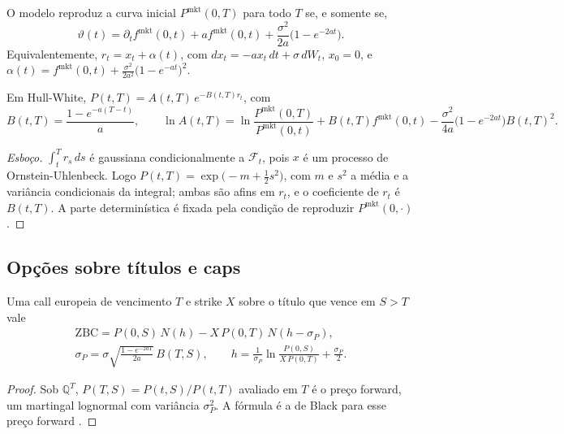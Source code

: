 \begin{proposicao}\label{prop:hw-theta}
O modelo reproduz a curva inicial $P^{\mathrm{mkt}}(0,T)$ para todo $T$ se, e somente se,
\begin{equation}
\vartheta(t)=\partial_tf^{\mathrm{mkt}}(0,t)+af^{\mathrm{mkt}}(0,t)+\frac{\sigma^2}{2a}\big(1-e^{-2at}\big).
\end{equation}
Equivalentemente, $r_t=x_t+\alpha(t)$, com $dx_t=-ax_t\,dt+\sigma\,dW_t$, $x_0=0$, e $\alpha(t)=f^{\mathrm{mkt}}(0,t)+\frac{\sigma^2}{2a^2}\big(1-e^{-at}\big)^2$.
\end{proposicao}

\begin{proposicao}
Em Hull-White, $P(t,T)=A(t,T)\,e^{-B(t,T)r_t}$, com
\begin{equation}
B(t,T)=\frac{1-e^{-a(T-t)}}{a},\qquad \ln A(t,T)=\ln\frac{P^{\mathrm{mkt}}(0,T)}{P^{\mathrm{mkt}}(0,t)}+B(t,T)f^{\mathrm{mkt}}(0,t)-\frac{\sigma^2}{4a}\big(1-e^{-2at}\big)B(t,T)^2.
\end{equation}
\end{proposicao}

\begin{proof}[Esboço]
$\int_t^Tr_s\,ds$ é gaussiana condicionalmente a $\mathcal F_t$, pois $x$ é um processo de Ornstein-Uhlenbeck. Logo $P(t,T)=\exp\big(-m+\tfrac12s^2\big)$, com $m$ e $s^2$ a média e a variância condicionais da integral; ambas são afins em $r_t$, e o coeficiente de $r_t$ é $B(t,T)$. A parte determinística é fixada pela condição de reproduzir $P^{\mathrm{mkt}}(0,\cdot)$.
\end{proof}

\subsection{Opções sobre títulos e caps}

\begin{teorema}
Uma call europeia de vencimento $T$ e strike $X$ sobre o título que vence em $S>T$ vale
\begin{gather}
\mathrm{ZBC}=P(0,S)\,N(h)-X\,P(0,T)\,N(h-\sigma_P),\\
\sigma_P=\sigma\sqrt{\frac{1-e^{-2aT}}{2a}}\,B(T,S),\qquad h=\frac1{\sigma_P}\ln\frac{P(0,S)}{X\,P(0,T)}+\frac{\sigma_P}{2}.
\end{gather}
\end{teorema}

\begin{proof}
Sob $\mathbb Q^T$, $P(T,S)=P(t,S)/P(t,T)$ avaliado em $T$ é o preço forward, um martingal lognormal com variância $\sigma_P^2$. A fórmula é a de Black para esse preço forward \citep{black1976,brigomercurio2006}.
\end{proof}

